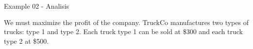 \begin{frame}{Example 02 - Analisis}

We must maximize the profit of the company. TruckCo manufactures two types of
trucks: type 1 and type 2. Each truck type 1 can be sold at \$300 and each truck
type 2 at \$500.

\end{frame}
